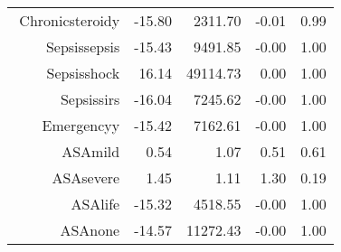 \begin{tabular}{rrrrr}
$$  Chronic\-steroid\-y & -15.80 & 2311.70 & -0.01 & 0.99 \\ 
  Sepsis\-sepsis & -15.43 & 9491.85 & -0.00 & 1.00 \\ 
  Sepsis\-shock & 16.14 & 49114.73 & 0.00 & 1.00 \\ 
  Sepsis\-sirs & -16.04 & 7245.62 & -0.00 & 1.00 \\ 
  Emergency\-y & -15.42 & 7162.61 & -0.00 & 1.00 \\ 
  ASA\-mild & 0.54 & 1.07 & 0.51 & 0.61 \\ 
  ASA\-severe & 1.45 & 1.11 & 1.30 & 0.19 \\ 
  ASA\-life & -15.32 & 4518.55 & -0.00 & 1.00 \\ 
  ASA\-none & -14.57 & 11272.43 & -0.00 & 1.00 \\ 
   \hline
\end{tabular}

